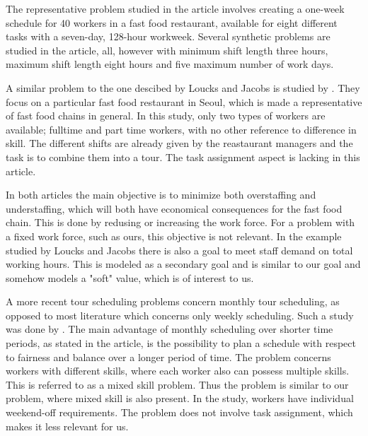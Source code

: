 The representative problem studied in the article involves creating a one-week schedule for 40 workers in a fast food restaurant, available for eight different tasks with a seven-day, 128-hour workweek. Several synthetic problems are studied in the article, all, however with minimum shift length three hours, maximum shift length eight hours and five maximum number of work days.

A similar problem to the one descibed by Loucks and Jacobs is studied by \citet{choi_hwang_park_2009}. They focus on a particular fast food restaurant in Seoul, which is made a representative of fast food chains in general. In this study, only two types of workers are available; fulltime and part time workers, with no other reference to difference in skill. The different shifts are already given by the reastaurant managers and the task is to combine them into a tour. The task assignment aspect is lacking in this article.


In both articles the main objective is to minimize both overstaffing and understaffing, which will both have economical consequences for the fast food chain. This is done by redusing or increasing the work force. For a problem with a fixed work force, such as ours, this objective is not relevant. In the example studied by Loucks and Jacobs there is also a goal to meet staff demand on total working hours. This is modeled as a secondary goal and is similar to our goal and somehow models a "soft" value, which is of interest to us.

A more recent tour scheduling problems concern monthly tour scheduling, as opposed to most literature which concerns only weekly scheduling. Such a study was done by \citet{rong_2010}. The main advantage of monthly scheduling over shorter time periods, as stated in the article, is the possibility to plan a schedule with respect to fairness and balance over a longer period of time. The problem concerns workers with different skills, where each worker also can possess multiple skills. This is referred to as a mixed skill problem. Thus the problem is similar to our problem, where mixed skill is also present. In the study, workers have individual weekend-off requirements. The problem does not involve task assignment, which makes it less relevant for us.

